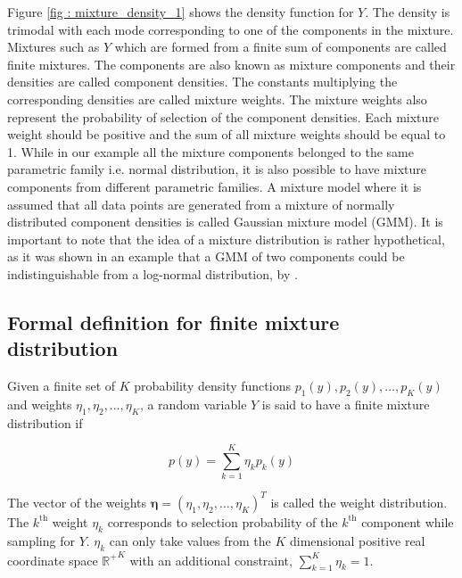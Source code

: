 Figure \ref{fig : mixture_density_1} shows the density function for $Y$. The density is trimodal with each mode corresponding to one of the components in the mixture. Mixtures such as $Y$ which are formed from a finite sum of components are called finite mixtures. The components are also known as mixture components and their densities are called component densities. The constants multiplying the corresponding densities are called mixture weights. The mixture weights also represent the probability of selection of the component densities. Each mixture weight should be positive and the sum of all mixture weights should be equal to 1. While in our example all the mixture components belonged to the same parametric family i.e. normal distribution, it is also possible to have mixture components from different parametric families. A mixture model where it is assumed that all data points are generated from a mixture of normally distributed component densities is called Gaussian mixture model (GMM). It is important to note that the idea of a mixture distribution is rather hypothetical, as it was shown in an example that a GMM of two components could be indistinguishable from a log-normal distribution, by \citet{titterington_statistical_1986}.

\subsection{Formal definition for finite mixture distribution}
\label{subsec : formal_def_mixture_dist}
Given a finite set of $K$ probability density functions $p_1(y), p_2(y), \ldots, p_K(y)$ and weights $\eta_1, \eta_2, \ldots, \eta_K$, a random variable $Y$ is said to have a finite mixture distribution if

$$p(y) = \sum_{k=1}^{K} \eta_{k} p_{k}(y)$$

The vector of the weights $\boldsymbol{\eta} = (\eta_1, \eta_2, \ldots, \eta_K)^T$ is called the weight distribution. The $k^\text{th}$ weight $\eta_{k}$ corresponds to selection probability of the $k^\text{th}$ component while sampling for $Y$. $\eta_{k}$ can only take values from the $K$ dimensional positive real coordinate space ${\mathbb{R}^{+}}^K$ with an additional constraint, $\sum_{k=1}^{K} \eta_{k} = 1$.\\

